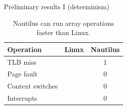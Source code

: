 \begin{block}{Preliminary results I (determinism)}
  \begin{table}
    \begin{tabular}{l || c | c }
      Operation & Linux & Nautilus \\
      \hline\hline
      TLB miss & & 1 \\
      Page fault & & 0 \\
      Context switches & & 0 \\
      Interrupts & & 0 \\
    \end{tabular}

    \caption{Nautilus can run array operations faster than Linux.}
  \end{table}

\end{block}
